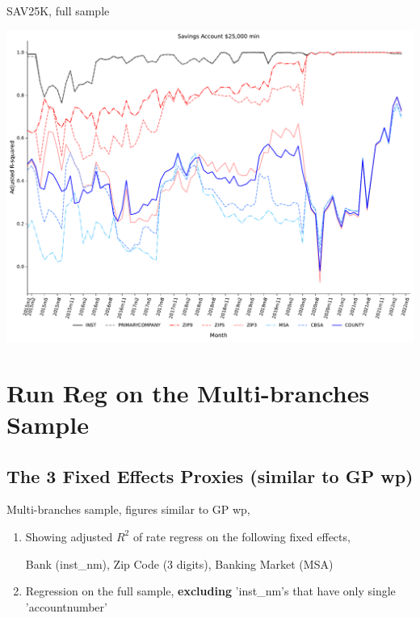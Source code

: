 \documentclass{beamer}
\begin{document}
\begin{frame}{SAV25K, full sample}
\begin{center}
\includegraphics[width=1\textwidth]{figure/all_sample_939605/all_fixed_effects/SAV25K_adjusted_R2_all_fixed_effects.pdf} 
\end{center}
\end{frame}






\section{Run Reg on the Multi-branches Sample}

\subsection{The 3 Fixed Effects Proxies (similar to GP wp)}

\begin{frame}
    \vfill
    \centering
    { Multi-branches sample, figures similar to GP wp,}
    
    \begin{enumerate}
        \item Showing adjusted $R^2$ of rate regress on the following fixed effects, 
            
            Bank (inst\_nm), Zip Code (3 digits), Banking Market (MSA)
        \item Regression on the full sample, {\textbf{excluding}} 'inst\_nm's that have only single 'accountnumber'
    \end{enumerate}
    \vfill
\end{frame}
\end{document}
